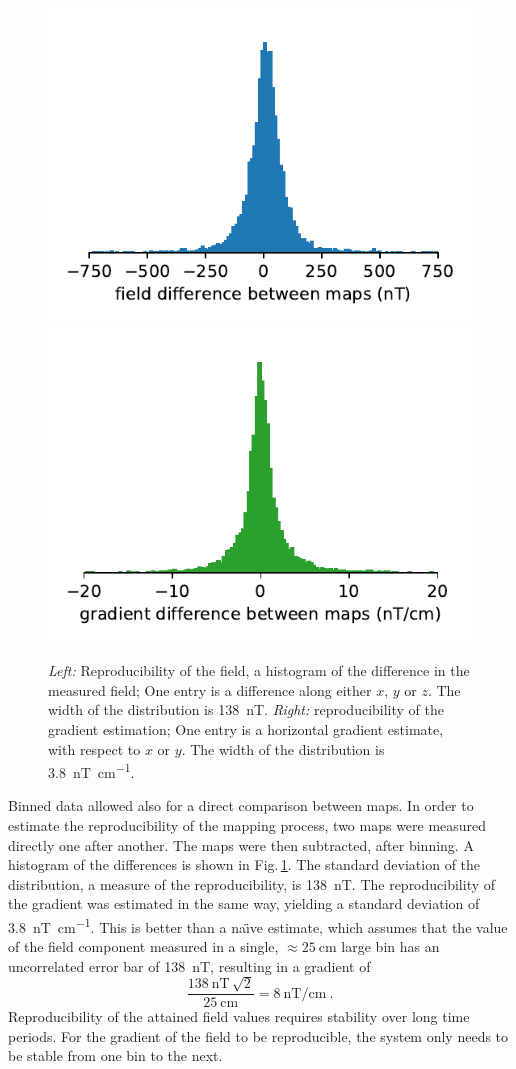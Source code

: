 \begin{figure}
  \centering
  \includegraphics[width=0.49\linewidth]{gfx/mapping/lpsc/reproducibility_field.pdf}
  \includegraphics[width=0.49\linewidth]{gfx/mapping/lpsc/reproducibility_gradient.pdf}
  \caption{\emph{Left:} Reproducibility of the field, a histogram of the difference in the measured field;
  One entry is a difference along either $x$, $y$ or $z$.
  The width of the distribution is \SI{138}{\nano\tesla}.
  \emph{Right:} reproducibility of the gradient estimation;
  One entry is a horizontal gradient estimate, with respect to $x$ or $y$.
  The width of the distribution is \SI[per-mode=symbol]{3.8}{\nano\tesla\per\centi\metre}.}\label{fig:mapping_bastille_reproducibility}
\end{figure}

Binned data allowed also for a direct comparison between maps.
In order to estimate the reproducibility of the mapping process, two maps were measured directly one after another.
The maps were then subtracted, after binning.
A histogram of the differences is shown in Fig.\,\ref{fig:mapping_bastille_reproducibility}.
The standard deviation of the distribution, a measure of the reproducibility, is \SI{138}{\nano\tesla}.
The reproducibility of the gradient was estimated in the same way, yielding a standard deviation of \SI[per-mode=symbol]{3.8}{\nano\tesla\per\centi\metre}.
This is better than a na\"{\i}ve estimate, which assumes that the value of the field component measured in a single,
$\approx \SI{25}{\centi\metre}$ large bin has an uncorrelated error bar of \SI{138}{\nano\tesla}, resulting in a gradient of
\begin{equation}
  \frac{\SI{138}{\nano\tesla} \, \sqrt{2}}{\SI{25}{\centi\meter}} = \SI[per-mode=symbol]{8}{\nano\tesla\per\centi\meter} \ .
\end{equation}
Reproducibility of the attained field values requires stability over long time periods.
For the gradient of the field to be reproducible, the system only needs to be stable from one bin to the next.

